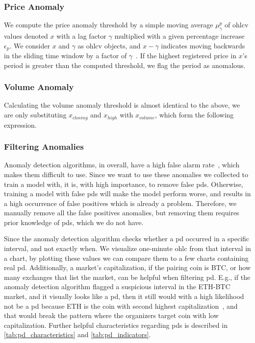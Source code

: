 \subsubsection{Price Anomaly}
We compute the price anomaly threshold by a simple moving average $\mu_\gamma^p$ of \ac{ohlcv} values denoted $x$ with a lag factor $\gamma$ multiplied with a given percentage increase $\epsilon_p$. We consider $x$ and $\gamma$ as \ac{ohlcv} objects, and $x-\gamma$ indicates moving backwards in the sliding time window by a factor of $\gamma$~\cite{P&D_to_the_moon}. If the highest registered price in $x$'s period is greater than the computed threshold, we flag the period as anomalous.


\subsubsection{Volume Anomaly}
Calculating the volume anomaly threshold is almost identical to the above, we are only substituting $x_{closing}$ and $x_{high}$ with $x_{volume}$, which form the following expression.


\subsubsection{Filtering Anomalies}
Anomaly detection algorithms, in overall, have a high false alarm rate~\cite{grill2017reducing}, which makes them difficult to use. Since we want to use these anomalies we collected to train a model with, it is, with high importance, to remove false \acp{pd}. Otherwise, training a model with false \acp{pd} will make the model perform worse, and results in a high occurrence of false positives which is already a problem. Therefore, we manually remove all the false positives anomalies, but removing them requires prior knowledge of \acp{pd}, which we do not have.

Since the anomaly detection algorithm checks whether a \ac{pd} occurred in a specific interval, and not exactly when. We visualize one-minute \ac{ohlc} from that interval in a chart, by plotting these values we can compare them to a few charts containing real \ac{pd}. Additionally, a market's capitalization, if the pairing coin is BTC, or how many exchanges that list the market, can be helpful when filtering \ac{pd}. E.g., if the anomaly detection algorithm flagged a suspicious interval in the ETH-BTC market, and it visually looks like a \ac{pd}, then it still would with a high likelihood not be a \ac{pd} because ETH is the coin with second highest capitalization~\cite{coinmarketcap_eth}, and that would break the pattern where the organizers target coin with low capitalization. Further helpful characteristics regarding \acp{pd} is described in \autoref{tab:pd_characteristics} and \autoref{tab:pd_indicators}.

